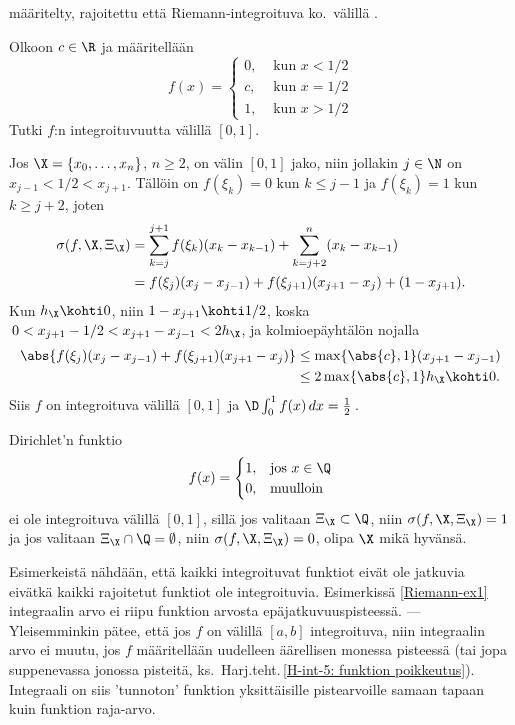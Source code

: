 määritelty, rajoitettu että Riemann-integroituva ko.\ välillä .
\begin{Exa} \label{Riemann-ex1}
Olkoon $c\in\R$ ja määritellään
\[
f(x)=\begin{cases}
0, &\text{ kun } x<1/2 \\
c, &\text{ kun } x=1/2 \\
1, &\text{ kun } x>1/2
\end{cases}
\]
Tutki $f$:n integroituvuutta välillä $[0,1]$.
\end{Exa}
\ratk Jos $\X=\{x_0,\ldots ,x_n\}$, $n \ge 2$, on välin $[0,1]$ jako, niin jollakin $j\in\N$
on $x_{j-1}<1/2<x_{j+1}$. Tällöin on $f(\xi_k)=0$ kun $k\leq j-1$ ja $f(\xi_k)=1$ kun 
$k\geq j+2$, joten
\begin{align*}
\sigma(f,\X,\Xi_\X) &= \sum_{k=j}^{j+1}f(\xi_k)(x_k-x_{k-1})+\sum_{k=j+2}^n (x_k-x_{k-1}) \\
&=f(\xi_j)(x_j-x_{j-1})+f(\xi_{j+1})(x_{j+1}-x_j)+(1-x_{j+1}).
\end{align*}
Kun $h_\X \kohti 0$, niin $1-x_{j+1} \kohti 1/2$, koska $\,0<x_{j+1}-1/2<x_{j+1}-x_{j-1}<2h_\X$,
ja kolmioepäyhtälön nojalla
\begin{align*}
\abs{f(\xi_j)(x_j-x_{j-1})+f(\xi_{j+1})(x_{j+1}-x_j)} 
                     &\le \max \{\abs{c},1\}(x_{j+1}-x_{j-1}) \\
                     &\le 2\max \{\abs{c},1\} h_\X \kohti 0.
\end{align*}
Siis $f$ on integroituva välillä $[0,1]$ ja $\D\int_0^1 f(x)\, dx=\frac{1}{2}\,$. \loppu

\begin{Exa} \label{Riemann-ex2}
Dirichlet'n funktio
\[
f(x)=\begin{cases}
1, &\text{jos}\ x\in\Q \\
0, &\text{muulloin}
\end{cases}
\]
ei ole integroituva välillä $[0,1]$, sillä jos valitaan $\Xi_\X\subset\Q$, niin 
$\sigma(f,\X,\Xi_\X)=1$ ja jos valitaan $\Xi_\X\cap\Q=\emptyset$, niin $\sigma(f,\X,\Xi_\X)=0$,
olipa $\X$ mikä hyvänsä. \loppu
\end{Exa}
Esimerkeistä nähdään, että kaikki integroituvat funktiot eivät ole jatkuvia eivätkä kaikki
rajoitetut funktiot ole integroituvia. Esimerkissä \ref{Riemann-ex1} integraalin arvo ei riipu
funktion arvosta epäjatkuvuuspisteessä. --- Yleisemminkin pätee, että jos $f$ on välillä $[a,b]$
integroituva, niin integraalin arvo ei muutu, jos $f$ määritellään uudelleen äärellisen monessa
pisteessä (tai jopa suppenevassa jonossa pisteitä, ks.\ 
Harj.teht.\,\ref{H-int-5: funktion poikkeutus}). Integraali on siis 'tunnoton' funktion
yksittäisille pistearvoille samaan tapaan kuin funktion raja-arvo.

